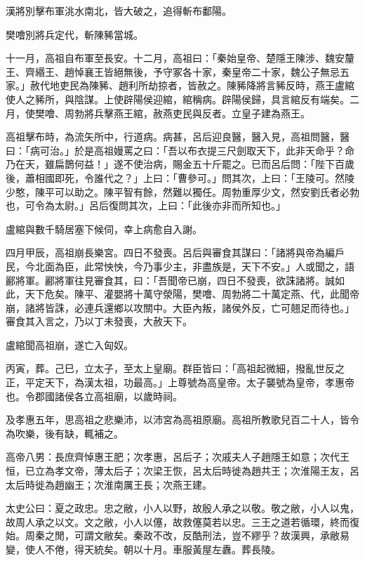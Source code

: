 \begin{pinyinscope}
漢將別擊布軍洮水南北，皆大破之，追得斬布鄱陽。

樊噲別將兵定代，斬陳豨當城。

十一月，高祖自布軍至長安。十二月，高祖曰：「秦始皇帝、楚隱王陳涉、魏安釐王、齊緡王、趙悼襄王皆絕無後，予守冢各十家，秦皇帝二十家，魏公子無忌五家。」赦代地吏民為陳豨、趙利所劫掠者，皆赦之。陳豨降將言豨反時，燕王盧綰使人之豨所，與陰謀。上使辟陽侯迎綰，綰稱病。辟陽侯歸，具言綰反有端矣。二月，使樊噲、周勃將兵擊燕王綰，赦燕吏民與反者。立皇子建為燕王。

高祖擊布時，為流矢所中，行道病。病甚，呂后迎良醫，醫入見，高祖問醫，醫曰：「病可治。」於是高祖嫚罵之曰：「吾以布衣提三尺劍取天下，此非天命乎？命乃在天，雖扁鵲何益！」遂不使治病，賜金五十斤罷之。已而呂后問：「陛下百歲後，蕭相國即死，令誰代之？」上曰：「曹參可。」問其次，上曰：「王陵可。然陵少憨，陳平可以助之。陳平智有餘，然難以獨任。周勃重厚少文，然安劉氏者必勃也，可令為太尉。」呂后復問其次，上曰：「此後亦非而所知也。」

盧綰與數千騎居塞下候伺，幸上病愈自入謝。

四月甲辰，高祖崩長樂宮。四日不發喪。呂后與審食其謀曰：「諸將與帝為編戶民，今北面為臣，此常怏怏，今乃事少主，非盡族是，天下不安。」人或聞之，語酈將軍。酈將軍往見審食其，曰：「吾聞帝已崩，四日不發喪，欲誅諸將。誠如此，天下危矣。陳平、灌嬰將十萬守滎陽，樊噲、周勃將二十萬定燕、代，此聞帝崩，諸將皆誅，必連兵還鄉以攻關中。大臣內叛，諸侯外反，亡可翹足而待也。」審食其入言之，乃以丁未發喪，大赦天下。

盧綰聞高祖崩，遂亡入匈奴。

丙寅，葬。己巳，立太子，至太上皇廟。群臣皆曰：「高祖起微細，撥亂世反之正，平定天下，為漢太祖，功最高。」上尊號為高皇帝。太子襲號為皇帝，孝惠帝也。令郡國諸侯各立高祖廟，以歲時祠。

及孝惠五年，思高祖之悲樂沛，以沛宮為高祖原廟。高祖所教歌兒百二十人，皆令為吹樂，後有缺，輒補之。

高帝八男：長庶齊悼惠王肥；次孝惠，呂后子；次戚夫人子趙隱王如意；次代王恒，已立為孝文帝，薄太后子；次梁王恢，呂太后時徙為趙共王；次淮陽王友，呂太后時徙為趙幽王；次淮南厲王長；次燕王建。

太史公曰：夏之政忠。忠之敝，小人以野，故殷人承之以敬。敬之敝，小人以鬼，故周人承之以文。文之敝，小人以僿，故救僿莫若以忠。三王之道若循環，終而復始。周秦之閒，可謂文敝矣。秦政不改，反酷刑法，豈不繆乎？故漢興，承敝易變，使人不倦，得天統矣。朝以十月。車服黃屋左纛。葬長陵。


\end{pinyinscope}